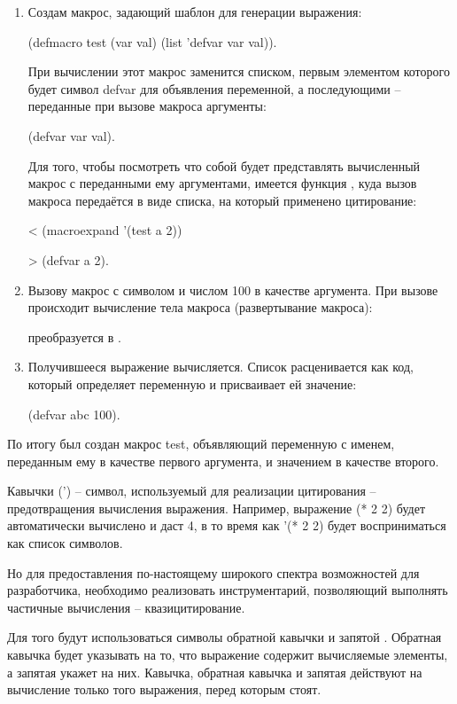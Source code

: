 \begin{enumerate}
	\item Создам макрос, задающий шаблон для генерации выражения:
	
	(defmacro test (var val) (list 'defvar var val)).
	
	При вычислении этот макрос заменится списком, первым элементом которого будет символ defvar для объявления переменной, а последующими -- переданные при вызове макроса аргументы:
	
	(defvar var val).
	
	Для того, чтобы посмотреть что собой будет представлять вычисленный макрос с переданными ему аргументами, имеется функция , куда вызов макроса передаётся в виде списка, на который применено цитирование:
	
	< (macroexpand '(test a 2))
	
	> (defvar a 2).
	
	\item Вызову макрос с символом  и числом 100 в качестве аргумента. При вызове происходит вычисление тела макроса (развертывание макроса):
	
	 преобразуется в .
	
	\item Получившееся выражение вычисляется. Список расценивается как код, который определяет переменную и присваивает ей значение:
	
	(defvar abc 100).
\end{enumerate}

По итогу был создан макрос test, объявляющий переменную с именем, переданным ему в качестве первого аргумента, и значением в качестве второго.

Кавычки (') -- символ, используемый для реализации цитирования -- предотвращения вычисления выражения. Например, выражение (* 2 2) будет автоматически вычислено и даст 4, в то время как '(* 2 2) будет восприниматься как список символов.

Но для предоставления по-настоящему широкого спектра возможностей для разработчика, необходимо реализовать инструментарий, позволяющий выполнять частичные вычисления -- квазицитирование.

Для того будут использоваться символы обратной кавычки  и запятой \quotes{,}. Обратная кавычка будет указывать на то, что выражение содержит вычисляемые элементы, а запятая укажет на них. Кавычка, обратная кавычка и запятая действуют на вычисление только того выражения, перед которым стоят.


